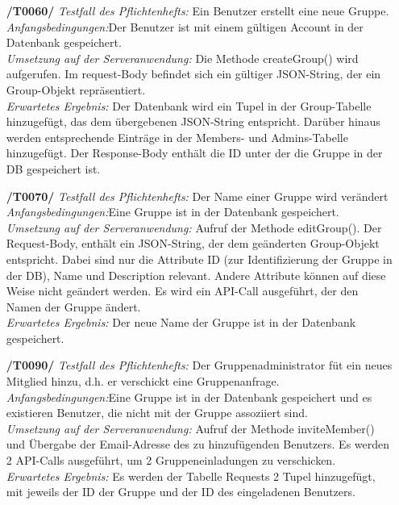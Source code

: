 \documentclass[11pt,a4paper]{scrartcl}
\begin{document}
\begin{enumerate}
	\item[\textbf{/T0060/}]
	\textit{Testfall des Pflichtenhefts: }Ein Benutzer erstellt eine neue Gruppe.\\
	\textit{Anfangsbedingungen:}Der Benutzer ist mit einem gültigen Account in der Datenbank gespeichert.\\
	\textit{Umsetzung auf der Serveranwendung: }Die Methode createGroup() wird aufgerufen. Im request-Body befindet sich ein gültiger JSON-String, der ein Group-Objekt repräsentiert.\\
	\textit{Erwartetes Ergebnis: }Der Datenbank wird ein Tupel in der Group-Tabelle hinzugefügt, das dem übergebenen JSON-String entspricht. Darüber hinaus werden entsprechende Einträge in der Members- und Admins-Tabelle hinzugefügt. Der Response-Body enthält die ID unter der die Gruppe in der DB gespeichert ist.
	
	\item[\textbf{/T0070/}]
	\textit{Testfall des Pflichtenhefts: }Der Name einer Gruppe wird verändert\\
	\textit{Anfangsbedingungen:}Eine Gruppe ist in der Datenbank gespeichert.\\
	\textit{Umsetzung auf der Serveranwendung: }Aufruf der Methode editGroup(). Der Request-Body, enthält ein JSON-String, der dem geänderten Group-Objekt entspricht. Dabei sind nur die Attribute ID (zur Identifizierung der Gruppe in der DB), Name und Description relevant. Andere Attribute können auf diese Weise nicht geändert werden. Es wird ein API-Call ausgeführt, der den Namen der Gruppe ändert.\\
	\textit{Erwartetes Ergebnis: }Der neue Name der Gruppe ist in der Datenbank gespeichert.
	
	\item[\textbf{/T0090/}]
	\textit{Testfall des Pflichtenhefts: }Der Gruppenadministrator füt ein neues Mitglied hinzu, d.h. er verschickt eine Gruppenanfrage.\\
	\textit{Anfangsbedingungen:}Eine Gruppe ist in der Datenbank gespeichert und es existieren Benutzer, die nicht mit der Gruppe assoziiert sind.\\
	\textit{Umsetzung auf der Serveranwendung: }Aufruf der Methode inviteMember() und Übergabe der Email-Adresse des zu hinzufügenden Benutzers. Es werden 2 API-Calls ausgeführt, um 2 Gruppeneinladungen zu verschicken.\\
	\textit{Erwartetes Ergebnis: }Es werden der Tabelle Requests 2 Tupel hinzugefügt, mit jeweils der ID der Gruppe und der ID des eingeladenen Benutzers.
	

\end{enumerate}
\end{document}
